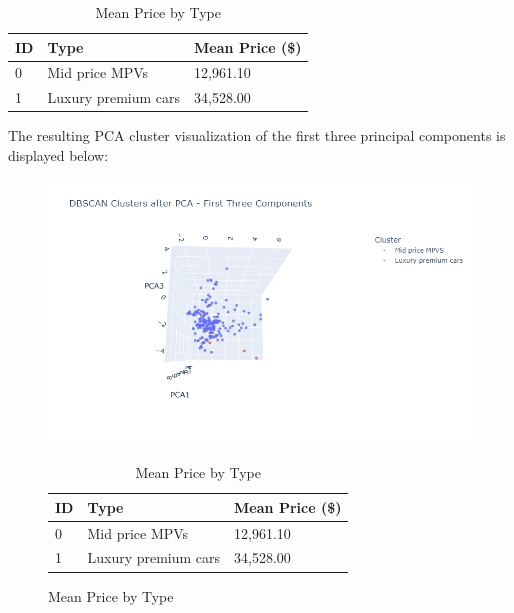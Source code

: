 \documentclass{article}
\begin{document}
\begin{table}[H]
    \centering
    \caption{Mean Price by Type}
    \begin{tabular}{lll}
        \toprule
        \textbf{ID} & \textbf{Type}       & \textbf{Mean Price (\$)} \\
        \midrule
        0           & Mid price MPVs      & 12,961.10                \\
        1           & Luxury premium cars & 34,528.00                \\
        \bottomrule
    \end{tabular}
\end{table}

The resulting PCA cluster visualization of the first three principal components is displayed below:

\begin{figure}[H]
    \centering
    \begin{minipage}{0.5\textwidth}
        \centering
        \includegraphics[width=1\textwidth]{image/paper/dbscan.png}
        \caption{PCA Visualization}
        \label{pca2}
    \end{minipage}\hfill
    \begin{minipage}{0.5\textwidth}
        \begin{table}[H]
            \centering
            \caption{Mean Price by Type}
            \begin{tabular}{lll}
                \toprule
                \textbf{ID} & \textbf{Type}       & \textbf{Mean Price (\$)} \\
                \midrule
                0           & Mid price MPVs      & 12,961.10                \\
                1           & Luxury premium cars & 34,528.00                \\
                \bottomrule
            \end{tabular}
        \end{table}

    \end{minipage}
\end{figure}
\end{document}
